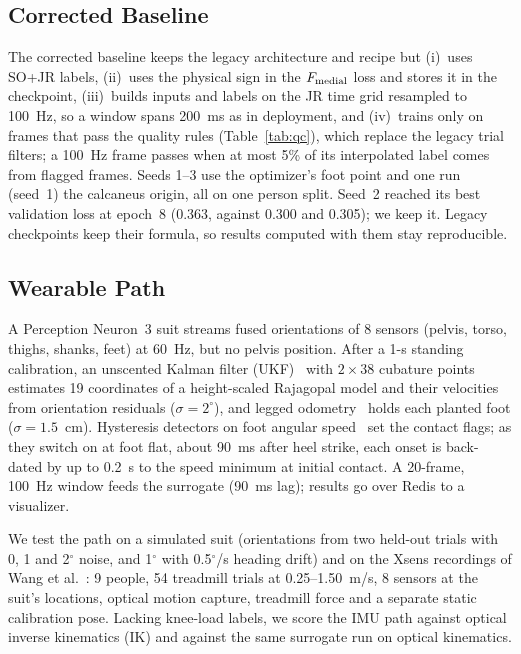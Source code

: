 \subsection{Corrected Baseline}\label{sec:corrected}
The corrected baseline keeps the legacy architecture and recipe but (i)~uses SO+JR labels,
(ii)~uses the physical sign in the $F_{\mathrm{medial}}$ loss and stores it in the checkpoint, (iii)~builds
inputs and labels on the JR time grid resampled to 100~Hz, so a window spans 200~ms as in
deployment, and (iv)~trains only on frames that pass the quality rules (Table~\ref{tab:qc}),
which replace the legacy trial filters; a 100~Hz frame passes when at most 5\% of its
interpolated label comes from flagged frames. Seeds 1--3 use the optimizer's foot point and one
run (seed~1) the calcaneus origin, all on one person split. Seed~2 reached its best validation
loss at epoch~8 (0.363, against 0.300 and 0.305); we keep it. Legacy checkpoints keep their
formula, so results computed with them stay reproducible.

\subsection{Wearable Path}\label{sec:wearable}
A Perception Neuron~3 suit streams fused orientations of 8 sensors (pelvis, torso, thighs,
shanks, feet) at 60~Hz, but no pelvis position. After a 1-s standing calibration, an unscented
Kalman filter (UKF)~\cite{julier2004unscented} with $2\times38$ cubature
points~\cite{arasaratnam2009cubature} estimates 19 coordinates of a height-scaled Rajagopal model
and their velocities from orientation residuals ($\sigma = 2^\circ$), and legged
odometry~\cite{bloesch2012state} holds each planted foot ($\sigma = 1.5$~cm). Hysteresis detectors
on foot angular speed~\cite{skog2010zero} set the contact flags; as they switch on at foot flat,
about 90~ms after heel strike, each onset is back-dated by up to 0.2~s to the speed minimum at
initial contact. A 20-frame, 100~Hz window feeds the surrogate (90~ms lag); results go over Redis
to a visualizer.

We test the path on a simulated suit (orientations from two held-out trials with 0, 1 and
2$^\circ$ noise, and 1$^\circ$ with 0.5$^\circ$/s heading drift) and on the Xsens recordings of
Wang et al.~\cite{wang2023twente}: 9 people, 54 treadmill trials at 0.25--1.50~m/s, 8 sensors at
the suit's locations, optical motion capture, treadmill force and a separate static calibration
pose. Lacking knee-load labels, we score the IMU path against optical inverse kinematics (IK) and
against the same surrogate run on optical kinematics.
